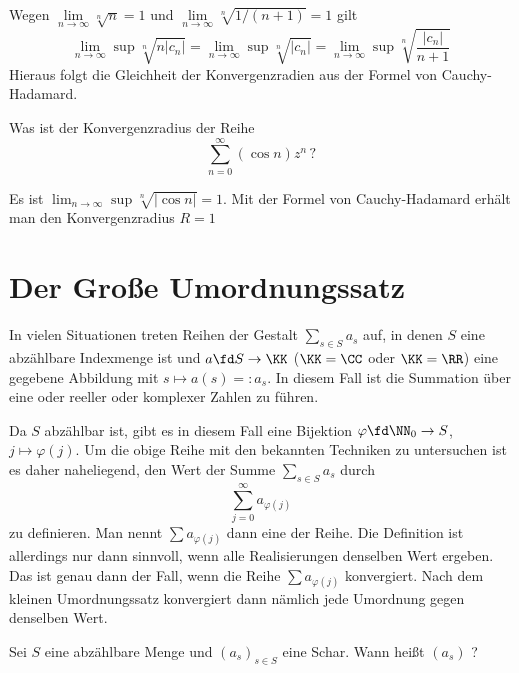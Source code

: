 \begin{antwort}
  Wegen $\lim\limits_{n\to\infty}\sqrt[n]{n} = 1$ und 
  $\lim\limits_{n\to\infty} \sqrt[n]{1/(n+1)} = 1$ gilt  
  \[
  \lim_{n\to\infty} \sup\sqrt[n]{n|c_n|}= 
  \lim_{n\to\infty} \sup\sqrt[n]{|c_n|} =
  \lim_{n\to\infty} \sup\sqrt[n]{\frac{|c_n|}{n+1}} 
  \]
  Hieraus folgt die Gleichheit der Konvergenzradien aus der Formel 
  von Cauchy-Hadamard. \AntEnd
\end{antwort}

\begin{frage}
  Was ist der Konvergenzradius der Reihe 
  \[
  \sum_{n=0}^\infty (\cos n) z^n\,?
  \]
\end{frage}

\begin{antwort}
  Es ist $\lim_{n\to\infty} \sup \sqrt[n]{|\cos n|}=1$. Mit der Formel von Cauchy-Hadamard erhält man den Konvergenzradius $R = 1$
\end{antwort}

\section{Der Große Umordnungssatz}\label{umordungssatz}

In vielen Situationen treten Reihen der Gestalt 
$\sum_{s\in S} a_s$
auf, in denen $S$ eine abzählbare Indexmenge ist und 
$a \fd S \to \KK$ ($\KK=\CC$ oder $\KK=\RR$) eine gegebene Abbildung 
mit $s\mapsto a(s)=:a_s$. In diesem Fall ist die Summation über eine 
 oder reeller oder komplexer Zahlen zu führen.

Da $S$ abzählbar ist, gibt es in diesem Fall 
eine Bijektion $\varphi \fd \NN_0\to S$, 
$j\mapsto \varphi(j)$. Um die obige Reihe mit den bekannten Techniken zu 
untersuchen ist es daher naheliegend, den Wert der Summe $\sum_{s\in S} a_s$ 
durch
\[
\sum_{j=0}^\infty a_{\varphi(j)} 
\]
zu definieren. Man nennt $\sum a_{\varphi(j)}$ dann eine 
 der Reihe. Die Definition ist allerdings nur dann 
sinnvoll, wenn alle Realisierungen denselben Wert ergeben. Das ist 
genau dann der Fall, wenn die Reihe $\sum a_{\varphi(j)}$ 
 konvergiert. Nach dem 
kleinen Umordnungssatz konvergiert dann nämlich jede Umordnung 
gegen denselben Wert.

\begin{frage}
  Sei $S$ eine abzählbare Menge und $(a_s)_{s\in S}$ eine Schar. Wann heißt 
  $(a_s)$ ? 
\end{frage}

